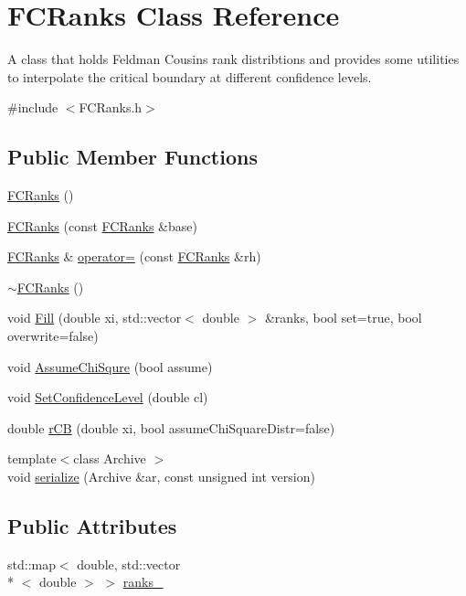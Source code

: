 \hypertarget{classFCRanks}{\section{F\-C\-Ranks Class Reference}
\label{classFCRanks}
}


A class that holds Feldman Cousins rank distribtions and provides some utilities to interpolate the critical boundary at different confidence levels.  




{\ttfamily \#include $<$F\-C\-Ranks.\-h$>$}

\subsection*{Public Member Functions}
\begin{DoxyCompactItemize}
\item 
\hyperlink{classFCRanks_a6db5a79e4fc52467381a44faaf6df285}{F\-C\-Ranks} ()
\item 
\hyperlink{classFCRanks_ac16822b8da96bef574edb47b9b3f9a97}{F\-C\-Ranks} (const \hyperlink{classFCRanks}{F\-C\-Ranks} \&base)
\item 
\hyperlink{classFCRanks}{F\-C\-Ranks} \& \hyperlink{classFCRanks_acd2e17576127b54187fba7215b47edfc}{operator=} (const \hyperlink{classFCRanks}{F\-C\-Ranks} \&rh)
\item 
\hyperlink{classFCRanks_a0a25cd6100cebd6d7d475b2eef5dd025}{$\sim$\-F\-C\-Ranks} ()
\item 
void \hyperlink{classFCRanks_a418d7d7351959647aba009a98fa5daec}{Fill} (double xi, std\-::vector$<$ double $>$ \&ranks, bool set=true, bool overwrite=false)
\item 
void \hyperlink{classFCRanks_a04064e2ddef37f609caebed6eb4a7949}{Assume\-Chi\-Squre} (bool assume)
\item 
void \hyperlink{classFCRanks_a816ee3d5819e1f52a6f30d385a571df2}{Set\-Confidence\-Level} (double cl)
\item 
double \hyperlink{classFCRanks_a7152d0742e2c2efa495582c155ab3ec9}{r\-C\-B} (double xi, bool assume\-Chi\-Square\-Distr=false)
\item 
{\footnotesize template$<$class Archive $>$ }\\void \hyperlink{classFCRanks_a920cac200dd2b306fe92b3423f83d6e2}{serialize} (Archive \&ar, const unsigned int version)
\end{DoxyCompactItemize}
\subsection*{Public Attributes}
\begin{DoxyCompactItemize}
\item 
std\-::map$<$ double, std\-::vector\\*
$<$ double $>$ $>$ \hyperlink{classFCRanks_a97d239b8b91d740673a25ebd90443337}{ranks\-\_\-}
\end{DoxyCompactItemize}
